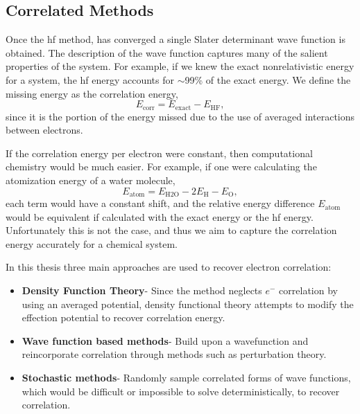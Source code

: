 \subsection{Correlated Methods}
Once the \gls{hf} method, has converged a single Slater determinant wave function is obtained.
The description of the wave function captures many of the salient properties of the system.
For example, if we knew the exact nonrelativistic energy for a system, the \gls{hf} energy accounts for $\sim$99\% of the exact energy.
We define the missing energy as the correlation energy,
\begin{equation}
E_{\mathrm{corr}} = E_{\mathrm{exact}} - E_{\mathrm{HF}},
\end{equation}
since it is the portion of the energy missed due to the use of averaged interactions between electrons.

If the correlation energy per electron were constant, then computational chemistry would be much easier.
For example, if one were calculating the atomization energy of a water molecule,
\begin{equation}
    E_{\mathrm{atom}} = E_{\mathrm{H2O}} - 2 E_{\mathrm{H}} - E_{\mathrm{O}},
\end{equation}
each term would have a constant shift, and the relative energy difference $E_{\mathrm{atom}}$ would be equivalent if calculated with the exact energy or the \gls{hf} energy.
Unfortunately this is not the case, and thus we aim to capture the correlation energy accurately for a chemical system.

In this thesis three main approaches are used to recover electron correlation:
\begin{itemize}
    \item \textbf{Density Function Theory}- Since the  method neglects $e^{-}$ correlation by using an averaged potential, density functional theory attempts to modify the effection potential to recover correlation energy.
    \item \textbf{Wave function based methods}- Build upon a  wavefunction and reincorporate correlation through methods such as perturbation theory.
\item \textbf{Stochastic methods}- Randomly sample correlated forms of wave functions, which would be difficult or impossible to solve deterministically, to recover correlation.
\end{itemize}
